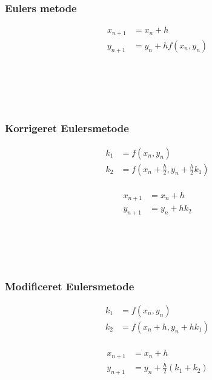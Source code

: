 %
\begin{frame}
\frametitle{Eulers metode } 
\begin{minipage}[b]{0.31\textwidth}
\begin{align*}
x_{n+1} & = x_n+h \\
y_{n+1} & = y_n + h f(x_n,y_n) \\
\phantom{x_1}\\
\\
\\
\end{align*}
\end{minipage}
\phantom{hejmeddig}
%

\\
\phantom{H}
\\
%
\end{frame}
%
%
%
%
\begin{frame}
\frametitle{Korrigeret Eulersmetode } 
\begin{minipage}[t]{0.31\textwidth}
\begin{align*}
k_1 & = f(x_n , y_n) \\
k_2 & = f \left( x_n + \frac{h}{2} , y_n + \frac{h}{2} k_1 \right)  \\
\end{align*}
\end{minipage} 
\phantom{Hej}
\begin{minipage}[t]{0.31\textwidth}
\begin{align*}
x_{n+1} & = x_n+h \\
y_{n+1} & = y_n + h k_2 \\
\end{align*}
\end{minipage} 
\\
%

\\
\phantom{H}
\\
%
\end{frame}
%
%
%
\begin{frame}
\frametitle{Modificeret Eulersmetode}  
\begin{minipage}[t]{0.31\textwidth}
\begin{align*}
k_1 & = f(x_n , y_n) \\
k_2 & = f( x_n + h , y_n  + h k_1 ) \\
\end{align*}
%
\end{minipage} 
\phantom{Hej}
\begin{minipage}[t]{0.31\textwidth}
\begin{align*}
x_{n+1} & = x_n+h \\
y_{n+1} & = y_n + \frac{h}{2} (k_1 + k_2 ) \\
\end{align*}
%
\end{minipage} 
\\

\\
\phantom{H}
\\
%
\end{frame}
